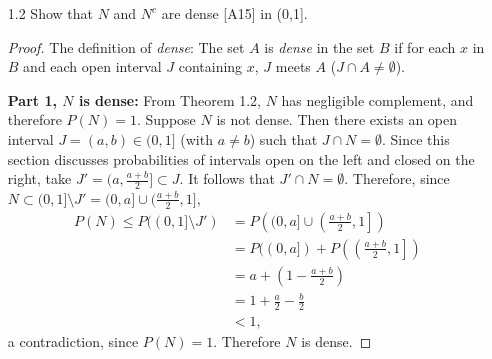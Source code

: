 \documentclass[letterpaper, 12pt]{article}
\begin{document}
\begin{enumerate}
\begin{enumerate}
\begin{proof}
For all $i$, each $\omega$ in the sample space is in $A_i$ or $A_i^c$. Therefore, for all $n$, each $\omega$ is in $\cap_{i=1}^n B_i$. Thus, $\omega \in \cap_{i=1}^\infty B_i$ and
\begin{equation}
P(\omega) \leq P(\cap_{i=1}^\infty B_i) = 0
\end{equation}
Supposing that $\Omega$ were a discrete space leads to the conclusion that
\begin{equation}
1 = P(\Omega) = \sum_{\omega \in \Omega} P(\omega) = \sum_{\omega \in \Omega} 0 = 0,
\end{equation}
a contradiction. Thus no discrete probability space can contain independent events $A_1, A_2, \dots$ such that $A_n$ has probability $p_n$.

\end{proof}

\end{enumerate}

\item[1.2]
Show that $N$ and $N^c$ are dense [A15] in (0,1].

\begin{proof}
The definition of \textit{dense}: The set $A$ is \textit{dense} in the set $B$ if for each $x$ in $B$ and each open interval $J$ containing $x$, $J$ meets $A$ ($J \cap A \neq \emptyset$).

\textbf{Part 1, $N$ is dense:} From Theorem 1.2, $N$ has negligible complement, and therefore $P(N)=1$. Suppose $N$ is not dense. Then there exists an open interval $J = (a,b) \in (0,1]$ (with $a \neq b$) such that $J \cap N = \emptyset$. Since this section discusses probabilities of intervals open on the left and closed on the right, take $J' = (a, \frac{a+b}{2}] \subset J$. It follows that $J' \cap N = \emptyset$. Therefore, since $N \subset (0,1] \setminus J' = (0,a] \cup (\frac{a+b}{2}, 1]$,
\begin{align}
P(N) \leq P((0,1] \setminus J') 
&= P\left((0,a] \cup \left(\frac{a+b}{2}, 1\right]\right) 
\\
&= P((0,a]) + P\left(\left(\frac{a+b}{2}, 1\right]\right) 
\\
&= a + \left(1 - \frac{a+b}{2}\right) 
\\
&= 1 + \frac{a}{2} - \frac{b}{2} 
\\
&< 1,
\end{align}
a contradiction, since $P(N) = 1$. Therefore $N$ is dense.


\end{proof}
\end{enumerate}
\end{document}
